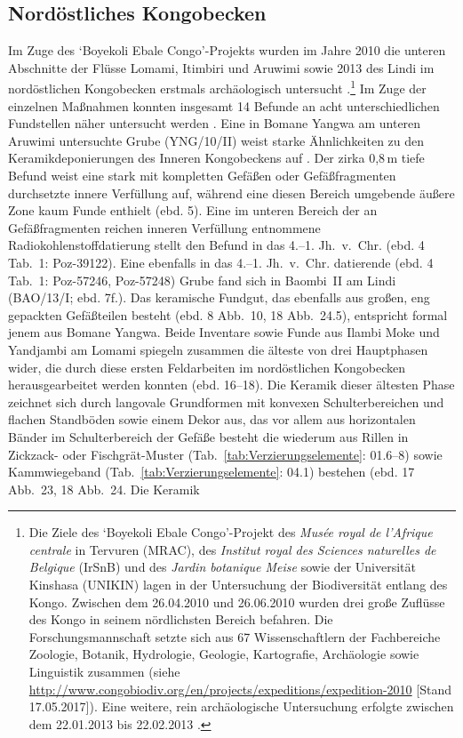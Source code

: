 \subsection{Nordöstliches Kongobecken}\label{sec:NordCongo}

Im Zuge des \enquote*{Boyekoli Ebale Congo}-Projekts wurden im Jahre 2010 die unteren Abschnitte der Flüsse Lomami, Itimbiri und Aruwimi sowie 2013 des Lindi im nordöstlichen Kongobecken erstmals archäologisch untersucht \parencite[2]{LivingstoneSmith.2017}.\footnote{Die Ziele des \enquote*{Boyekoli Ebale Congo}-Projekt des \textit{Musée royal de l'Afrique centrale} in Tervuren (MRAC), des \textit{Institut royal des Sciences naturelles de Belgique} (IrSnB) und des \textit{Jardin botanique Meise} sowie der Universität Kinshasa (UNIKIN) lagen in der Untersuchung der Biodiversität entlang des Kongo. Zwischen dem 26.04.2010 und 26.06.2010 wurden drei große Zuflüsse des Kongo in seinem nördlichsten Bereich befahren. Die Forschungsmannschaft setzte sich aus 67 Wissenschaftlern der Fachbereiche Zoologie, Botanik, Hydrologie, Geologie, Kartografie, Archäologie sowie Linguistik zusammen (siehe \url{http://www.congobiodiv.org/en/projects/expeditions/expedition-2010} [Stand 17.05.2017]). Eine weitere, rein archäologische Untersuchung erfolgte zwischen dem 22.01.2013 bis 22.02.2013 \parencites[siehe][]{LivingstoneSmith.2011}{Cornelissen.2013}.\label{ftn:BoyekoliEbaleCongo}} Im Zuge der einzelnen Maßnahmen konnten insgesamt 14 Befunde an acht unterschiedlichen Fundstellen näher untersucht werden \parencite[4 Tab.~1]{LivingstoneSmith.2017}. Eine in Bomane Yangwa am unteren Aruwimi untersuchte Grube (YNG/10/II) weist starke Ähnlichkeiten zu den Keramikdeponierungen des Inneren Kongobeckens auf \parencites[13 Abb.~2]{LivingstoneSmith.2011}[siehe][]{Wotzka.1993}. Der zirka 0,8\,m tiefe Befund weist eine stark mit kompletten Gefäßen oder Gefäßfragmenten \parencites[siehe][14 Abb.~3]{LivingstoneSmith.2011}[18 Abb.~24.4]{LivingstoneSmith.2017} durchsetzte innere Verfüllung auf, während eine diesen Bereich umgebende äußere Zone kaum Funde enthielt (ebd. 5). Eine im unteren Bereich der an Gefäßfragmenten reichen inneren Verfüllung entnommene Radiokohlenstoffdatierung stellt den Befund in das 4.--1. Jh.~v.~Chr. (ebd. 4 Tab.~1: Poz-39122). Eine ebenfalls in das 4.--1. Jh.~v.~Chr. datierende (ebd. 4 Tab.~1: Poz-57246, Poz-57248) Grube fand sich in Baombi~II am Lindi (BAO/13/I; ebd. 7f.). Das keramische Fundgut, das ebenfalls aus großen, eng gepackten Gefäßteilen besteht (ebd. 8 Abb.~10, 18 Abb.~24.5), entspricht formal jenem aus Bomane Yangwa. Beide Inventare sowie Funde aus Ilambi Moke und Yandjambi am Lomami spiegeln zusammen die älteste von drei Hauptphasen wider, die durch diese ersten Feldarbeiten im nordöstlichen Kongobecken herausgearbeitet werden konnten (ebd. 16--18). Die Keramik dieser ältesten Phase zeichnet sich durch langovale Grundformen mit konvexen Schulterbereichen und flachen Standböden sowie einem Dekor aus, das vor allem aus horizontalen Bänder im Schulterbereich der Gefäße besteht die wiederum aus Rillen in Zickzack- oder Fischgrät-Muster (Tab.~\ref{tab:Verzierungselemente}: 01.6--8) sowie Kammwiegeband (Tab.~\ref{tab:Verzierungselemente}: 04.1) bestehen (ebd. 17 Abb.~23, 18 Abb.~24. Die Keramik 